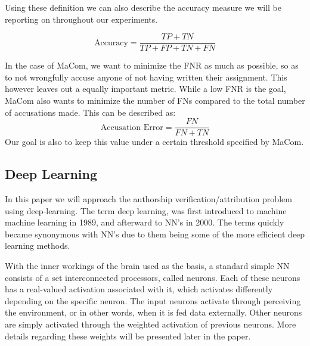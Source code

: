Using these definition we can also describe the accuracy measure we will be
reporting on throughout our experiments.

\begin{equation}
    \text{Accuracy} = \frac{TP + TN}{TP + FP + TN + FN}
\end{equation}


In the case of MaCom, we want to minimize the \gls{FNR} as much as possible, so
as to not wrongfully accuse anyone of not having written their assignment.
This however leaves out a equally important metric. While a low \gls{FNR}
is the goal, MaCom also wants to minimize the number of \gls{FN}s compared
to the total number of accusations made. This can be described as:
$$
\text{Accusation Error} = \frac{FN}{FN + TN}
$$
Our goal is also to keep this value under a certain threshold specified by MaCom.

\subsection{Deep Learning}

In this paper we will approach the authorship verification/attribution problem
using deep-learning. The term deep learning, was first introduced to
machine machine learning in 1989, and afterward to \gls{NN}'s in 2000. The terms
quickly became synonymous with \gls{NN}'s due to them being some of the more
efficient deep learning methods.\cite{Schmidhuber:2015}

With the inner workings of the brain used as the basis, a standard simple
\gls{NN} consists of a set interconnected processors, called neurons. Each of
these neurons has a real-valued activation associated with it, which activates
differently depending on the specific neuron. The input neurons activate through
perceiving the environment, or in other words, when it is fed data externally.
Other neurons are simply activated through the weighted activation of previous
neurons. More details regarding these weights will be presented later in the
paper.\cite{DBLP:journals/corr/Schmidhuber14}

